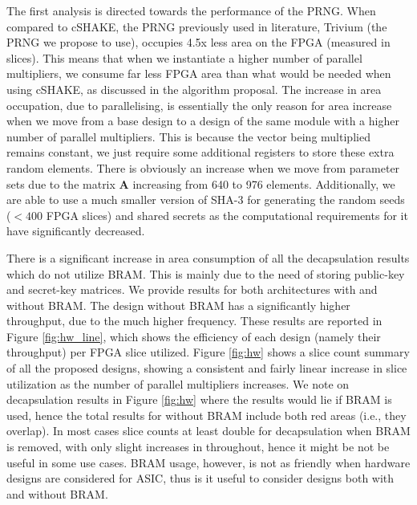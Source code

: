 The first analysis is directed towards the performance of the PRNG. When compared to cSHAKE, the PRNG previously used in literature, Trivium (the PRNG we propose to use), occupies 4.5x less area on the FPGA (measured in slices). This means that when we instantiate a higher number of parallel multipliers, we consume far less FPGA area than what would be needed when using cSHAKE, as discussed in the algorithm proposal. The increase in area occupation, due to parallelising, is essentially the only reason for area increase when we move from a base design to a design of the same module with a higher number of parallel multipliers. This is because the vector being multiplied remains constant, we just require some additional registers to store these extra random elements. There is obviously an increase when we move from parameter sets due to the matrix $\mathbf{A}$ increasing from 640 to 976 elements. Additionally, we are able to use a much smaller version of SHA-3 for generating the random seeds ($<400$ FPGA slices) and shared secrets as the computational requirements for it have significantly decreased.

There is a significant increase in area consumption of all the decapsulation results which do not utilize BRAM. This is mainly due to the need of storing public-key and secret-key matrices. We provide results for both architectures with and without BRAM. The design without BRAM has a significantly higher throughput, due to the much higher frequency. These results are reported in Figure \ref{fig:hw_line}, which shows the efficiency of each design (namely their throughput) per FPGA slice utilized. 
Figure \ref{fig:hw} shows a slice count summary of all the proposed designs, showing a consistent and fairly linear increase in slice utilization as the number of parallel multipliers increases. We note on decapsulation results in Figure \ref{fig:hw} where the results would lie if BRAM is used, hence the total results for without BRAM include both red areas (i.e., they overlap). In most cases slice counts at least double for decapsulation when BRAM is removed, with only slight increases in throughout, hence it might be not be useful in some use cases. BRAM usage, however, is not as friendly when hardware designs are considered for ASIC, thus is it useful to consider designs both with and without BRAM.

